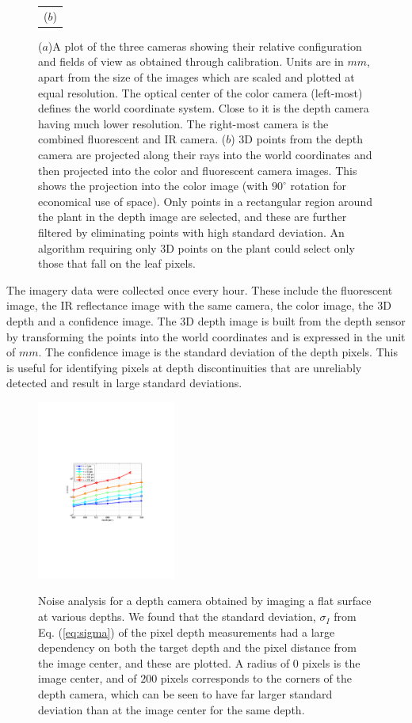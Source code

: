 \begin{figure}
\begin{tabular}{c}
  ($b$)\\
\end{tabular}
\caption{($a$)A plot of the three cameras showing their relative configuration and fields of view as obtained through calibration.  Units are in $mm$, apart from the size of the images which are scaled and plotted at equal resolution.  The optical center of the color camera (left-most) defines the world coordinate system.  Close to it is the depth camera having much lower resolution.  The right-most camera is the combined fluorescent and IR camera. ($b$) $3$D points from the depth camera are projected along their rays into the world coordinates and then projected into the color and fluorescent camera images.  This shows the projection into the color image (with $90^{\circ}$ rotation for economical use of space).  Only points in a rectangular region around the plant in the depth image are selected, and these are further filtered by eliminating points with high standard deviation.  An algorithm requiring only $3$D points on the plant could select only those that fall on the leaf pixels.}
\label{fig:CameraConfiguration}
\end{figure}

The imagery data were collected once every hour.
These include the fluorescent image, the IR reflectance image with the same camera, the color image, the $3$D depth and a confidence image.
The $3$D depth image is built from the depth sensor by transforming the points into the world coordinates and is expressed in the unit of $mm$.
The confidence image is the standard deviation of the depth pixels.
This is useful for identifying pixels at depth discontinuities that are unreliably detected and result in large standard deviations.


\begin{figure}
\centering
  \includegraphics[height=5.9cm,trim=110 250 60 260,clip]{Figures/SigmaRadius} \\
\caption{Noise analysis for a depth camera obtained by imaging a flat surface at various depths.  We found that the standard deviation, $\sigma_I$ from Eq. (\ref{eq:sigma}) of the pixel depth measurements had a large dependency on both the target depth and the pixel distance from the image center, and these are plotted.  A radius of $0$ pixels is the image center, and of $200$ pixels corresponds to the corners of the depth camera, which can be seen to have far larger standard deviation than at the image center for the same depth. }
\label{fig:Noise}
\end{figure}

